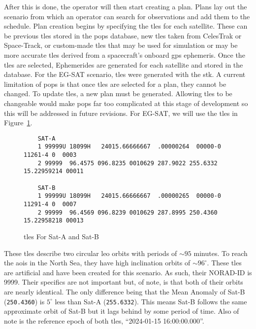 After this is done, the operator will then start creating a plan. Plans lay out
the scenario from which an operator can search for observations and add
them to the schedule. Plan creation begins by specifying the
\glspl{tle} for each satellite.  These can be previous \glspl{tle} stored in
the \gls{pops} database, new \glspl{tle} taken from CelesTrak or Space-Track,
or custom-made \glspl{tle} that may be used for simulation or may be more
accurate \glspl{tle} derived from a spacecraft’s onboard \gls{gps} ephemeris.
Once the \glspl{tle} are selected, Ephemerides are generated for each satellite
and stored in the database. For the EG-SAT scenario, \glspl{tle} were generated
with the \gls{stk}. A current limitation of \gls{pops} is that once \glspl{tle}
are selected for a plan, they cannot be changed. To update \glspl{tle}, a new
plan must be generated. Allowing \glspl{tle} to be changeable would make
\gls{pops} far too complicated at this stage of development so this will be
addressed in future revisions. For EG-SAT, we will use the \glspl{tle} in
Figure~\ref{fig:tles}.

\begin{figure}[h]
    \begin{verbatim}
    SAT-A
    1 99999U 18099H   24015.66666667  .00000264  00000-0  11261-4 0  0003
    2 99999  96.4575 096.8235 0010629 287.9022 255.6332 15.22959214 00011

    SAT-B
    1 99999U 18099H   24015.66666667  .00000265  00000-0  11291-4 0  0007
    2 99999  96.4569 096.8239 0010629 287.8995 250.4360 15.22958218 00013
    \end{verbatim}
    \caption{\glspl{tle} For Sat-A and Sat-B}
    \label{fig:tles}
\end{figure}

These \glspl{tle} describe two circular \gls{leo} orbits with periods of
$\sim95$ minutes. To reach the \glspl{aoi} in the North Sea, they have high
inclination orbits of $\sim96^\circ$. These \glspl{tle} are artificial and have
been created for this scenario.  As such, their NORAD-ID is 9999.  Their
specifics are not important but, of note, is that both of their orbits are
nearly identical.  The only difference being that the Mean Anomaly of Sat-B
(\texttt{250.4360}) is $5^\circ$ less than Sat-A (\texttt{255.6332}).  This
means Sat-B follows the same approximate orbit of Sat-B but it lags behind by
some period of time. Also of note is the reference epoch of both \glspl{tle},
``2024-01-15 16:00:00.000''.

